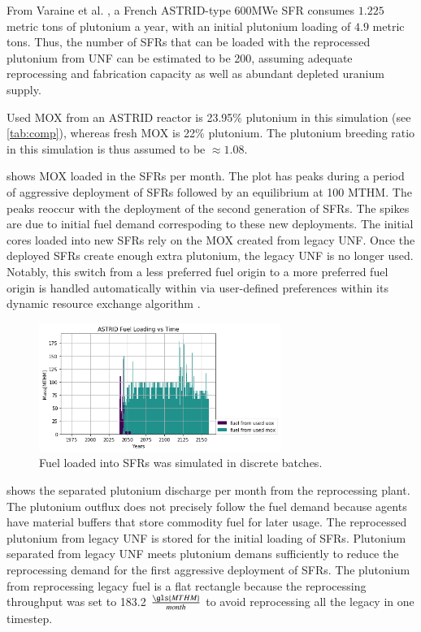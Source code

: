 From Varaine et al. \cite{varaine_pre-conceptual_2012}, a French
ASTRID-type 600\gls{MWe} \gls{SFR} consumes $1.225$ metric tons of
plutonium a year, with an initial plutonium loading of $4.9$ metric tons. 
Thus, the number of \glspl{SFR} that can be loaded with the reprocessed
plutonium from \gls{UNF} can be estimated to be 200, assuming adequate 
reprocessing and fabrication capacity as well as abundant depleted uranium 
supply.
 
Used \gls{MOX} from an ASTRID reactor is 23.95\% plutonium
in this simulation (see \cref{tab:comp}), whereas fresh \gls{MOX} is 22\% plutonium.
The plutonium breeding ratio in this simulation is thus assumed to be
$\approx 1.08$.

 shows \gls{MOX} loaded in the \glspl{SFR} per month.  The plot 
has peaks during a period of aggressive deployment of \glspl{SFR} followed by 
an equilibrium at 100 \gls{MTHM}. The peaks reoccur with the deployment of the 
second generation of \glspl{SFR}.  The spikes are due to initial fuel demand 
correspoding to these new deployments.  The initial cores loaded into new 
\glspl{SFR} rely on the \gls{MOX} created from legacy \gls{UNF}. Once the 
deployed \glspl{SFR} create enough extra plutonium, the legacy \gls{UNF} is no 
longer used. Notably, this switch from a less preferred fuel origin to a more 
preferred fuel origin is handled automatically within \Cyclus via user-defined preferences 
within its dynamic resource exchange algorithm \cite{gidden_methodology_2016}.


\begin{figure}[htbp!]
	\begin{center}
		\includegraphics[width=0.7\textwidth]{./images/french-transition/where_fuel.png}
	\end{center}
	\caption{Fuel loaded into \glspl{SFR} was simulated in discrete 
        batches.}
	\label{fig:fuel}
\end{figure}

 shows the separated plutonium discharge per month from the reprocessing plant. The plutonium outflux does not precisely follow the fuel demand because \Cyclus agents have material buffers that store commodity fuel for later usage. The reprocessed plutonium from legacy \gls{UNF} is stored for the initial loading of \glspl{SFR}.  Plutonium separated from legacy \gls{UNF} meets plutonium demans sufficiently to reduce the reprocessing demand for the first aggressive deployment of \glspl{SFR}.  The plutonium from reprocessing legacy fuel is a flat rectangle because the reprocessing throughput was set to 183.2 $\frac{\gls{MTHM}}{month}$ to avoid reprocessing all the legacy in one timestep. 
 

